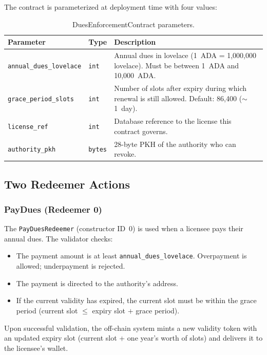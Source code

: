 The contract is parameterized at deployment time with four values:

\begin{table}[H]
\centering
\small
\begin{tabular}{@{}llp{6cm}@{}}
\toprule
\textbf{Parameter} & \textbf{Type} & \textbf{Description} \\
\midrule
\texttt{annual\_dues\_lovelace} & \texttt{int} & Annual dues in lovelace (1~ADA = 1,000,000 lovelace). Must be between 1~ADA and 10,000~ADA. \\
\texttt{grace\_period\_slots} & \texttt{int} & Number of slots after expiry during which renewal is still allowed. Default: 86,400 (${\sim}$1~day). \\
\texttt{license\_ref} & \texttt{int} & Database reference to the license this contract governs. \\
\texttt{authority\_pkh} & \texttt{bytes} & 28-byte PKH of the authority who can revoke. \\
\bottomrule
\end{tabular}
\caption{DuesEnforcementContract parameters.}
\label{tab:dues-params}
\end{table}

\subsection{Two Redeemer Actions}

\subsubsection{PayDues (Redeemer 0)}

The \texttt{PayDuesRedeemer} (constructor ID~0) is used when a licensee
pays their annual dues. The validator checks:
\begin{itemize}[nosep]
  \item The payment amount is at least \texttt{annual\_dues\_lovelace}.
    Overpayment is allowed; underpayment is rejected.
  \item The payment is directed to the authority's address.
  \item If the current validity has expired, the current slot must be
    within the grace period (current slot $\leq$ expiry slot $+$
    grace period).
\end{itemize}

Upon successful validation, the off-chain system mints a new validity
token with an updated expiry slot (current slot + one year's worth of
slots) and delivers it to the licensee's wallet.

